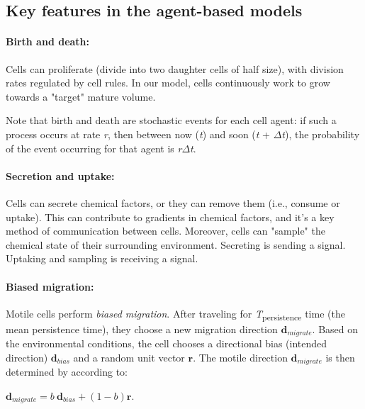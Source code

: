 \documentclass{article}
\begin{document}
\subsection{Key features in the agent-based
models}

\paragraph{Birth and death:}\label{birth-and-death}

Cells can proliferate (divide into two daughter cells of half size),
with division rates regulated by cell rules. In our model, cells
continuously work to grow towards a "target" mature volume.

Note that birth and death are stochastic events for each cell agent: if
such a process occurs at rate \emph{r}, then between now (\emph{t}) and
soon (\emph{t} + $\Delta$\emph{t}), the probability of the event occurring for
that agent is \emph{r}$\Delta$\emph{t}.

\paragraph{Secretion and uptake:}\label{secretion-and-uptake}

Cells can secrete chemical factors, or they can remove them (i.e.,
consume or uptake). This can contribute to gradients in chemical
factors, and it's a key method of communication between cells. Moreover,
cells can "sample" the chemical state of their surrounding environment.
Secreting is sending a signal. Uptaking and sampling is receiving a
signal.

\paragraph{Biased migration:}\label{biased-migration}

Motile cells perform \emph{biased migration}. After traveling for
\emph{T}\textsubscript{persistence} time (the mean persistence time),
they choose a new migration direction $\mathbf{d}_{migrate}$. Based
on the environmental conditions, the cell chooses a directional bias
(intended direction) $\mathbf{d}_{bias}$ and a random unit vector
$\mathbf{r}$. The motile direction $\mathbf{d}_{migrate}$ is then determined
by according to:

\begin{center}
$\mathbf{d}_{migrate} = b \: \mathbf{d}_{bias} + (1-b) \mathbf{r}$.
\end{center}
\end{document}
